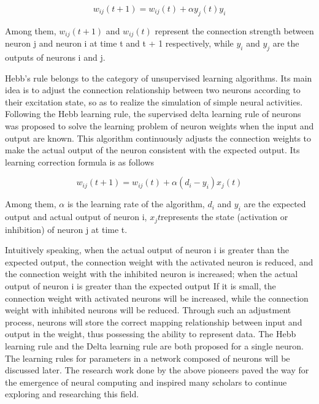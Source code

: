 \documentclass[paper=a4, fontsize=11pt]{scrartcl} %
\numberwithin{equation}{section} %
\numberwithin{figure}{section} %
\numberwithin{table}{section} %
\begin{document}
\begin{equation}
    w_{ij}(t + 1) = w_{ij}(t) + \alpha y_j(t)y_i
\end{equation}

Among them, $w_{ij}(t+1)$ and $w_{ij}(t)$ represent the connection strength between neuron j and neuron i at time t and t + 1 respectively, while $y_i$ and $y_j$ are the outputs of neurons i and j.


Hebb's rule belongs to the category of unsupervised learning algorithms. Its main idea is to adjust the connection relationship between two neurons according to their excitation state, so as to realize the simulation of simple neural activities. Following the Hebb learning rule, the supervised delta learning rule of neurons was proposed to solve the learning problem of neuron weights when the input and output are known. This algorithm continuously adjusts the connection weights to make the actual output of the neuron consistent with the expected output. Its learning correction formula is as follows


\begin{equation}
    w_{ij}(t + 1) = w_{ij}(t) + \alpha(d_i - y_i)x_j(t)
\end{equation}

Among them, $\alpha$ is the learning rate of the algorithm, $d_i$ and $y_i$ are the expected output and actual output of neuron i, $x_j{t}$represents the state (activation or inhibition) of neuron j at time t.

Intuitively speaking, when the actual output of neuron i is greater than the expected output, the connection weight with the activated neuron is reduced, and the connection weight with the inhibited neuron is increased; when the actual output of neuron i is greater than the expected output If it is small, the connection weight with activated neurons will be increased, while the connection weight with inhibited neurons will be reduced. Through such an adjustment process, neurons will store the correct mapping relationship between input and output in the weight, thus possessing the ability to represent data. The Hebb learning rule and the Delta learning rule are both proposed for a single neuron. The learning rules for parameters in a network composed of neurons will be discussed later. The research work done by the above pioneers paved the way for the emergence of neural computing and inspired many scholars to continue exploring and researching this field.
\end{document}
